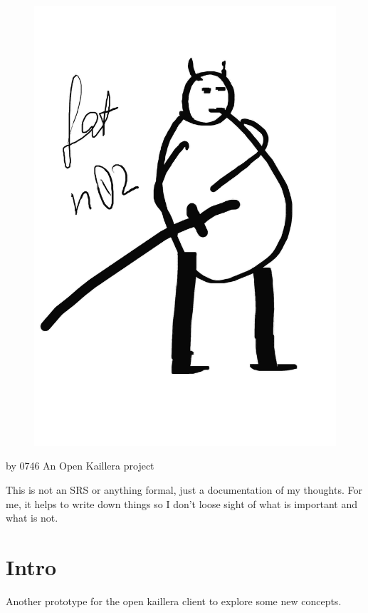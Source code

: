 \documentclass{article}
\begin{document}
\begin{figure}[th]
\includegraphics[width=1.00\textwidth]{logo.jpg}
\end{figure}

\clearpage
by 0746 \newline
An Open Kaillera project


This is not an SRS or anything formal, just a documentation of my thoughts.
 For me, it helps to write down things so I don't loose sight of what is
 important and what is not.

\twocolumn

\tableofcontents


\section{Intro}
Another prototype for the open kaillera client to explore some new concepts.
\end{document}
